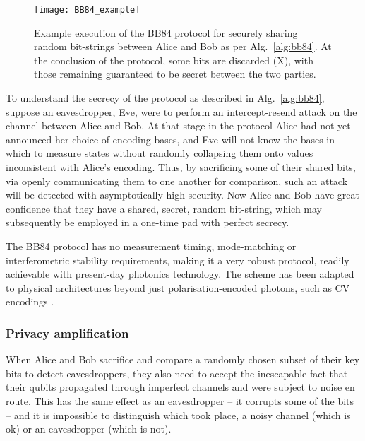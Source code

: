 \begin{figure}[!htbp]
\texttt{[image: BB84\_example]}
\captionspacefig \caption{Example execution of the BB84 protocol for securely sharing random bit-strings between Alice and Bob as per Alg.~\ref{alg:bb84}. At the conclusion of the protocol, some bits are discarded (X), with those remaining guaranteed to be secret between the two parties.} \label{fig:BB84_example}	
\end{figure}

To understand the secrecy of the protocol as described in Alg.~\ref{alg:bb84}, suppose an eavesdropper, Eve, were to perform an intercept-resend attack on the channel between Alice and Bob. At that stage in the protocol Alice had not yet announced her choice of encoding bases, and Eve will not know the bases in which to measure states without randomly collapsing them onto values inconsistent with Alice's encoding. Thus, by sacrificing some of their shared bits, via openly communicating them to one another for comparison, such an attack will be detected with asymptotically high security. Now Alice and Bob have great confidence that they have a shared, secret, random bit-string, which may subsequently be employed in a one-time pad with perfect secrecy.

The BB84 protocol has no measurement timing, mode-matching or interferometric stability requirements, making it a very robust protocol, readily achievable with present-day photonics technology. The scheme has been adapted to physical architectures beyond just polarisation-encoded photons, such as CV encodings \cite{???}.

%
%

\subsubsection{Privacy amplification}

When Alice and Bob sacrifice and compare a randomly chosen subset of their key bits to detect eavesdroppers, they also need to accept the inescapable fact that their qubits propagated through imperfect channels and were subject to noise en route. This has the same effect as an eavesdropper -- it corrupts some of the bits -- and it is impossible to distinguish which took place, a noisy channel (which is ok) or an eavesdropper (which is not).


